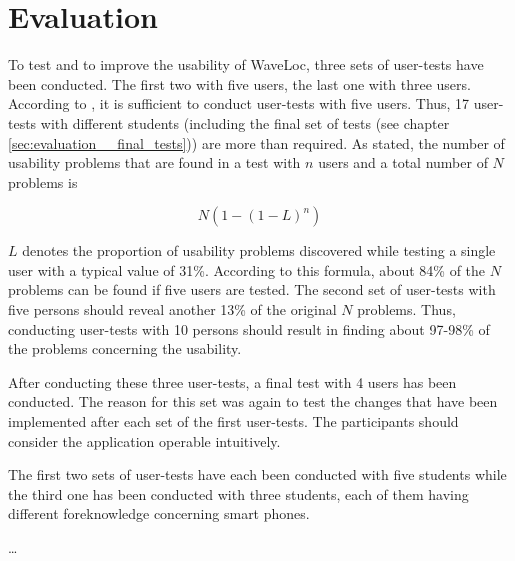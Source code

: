 \chapter{Evaluation}
\label{cha:evaluation}

To  test and to improve the usability of WaveLoc, three sets of user-tests have been conducted. The first two with five users, the last one with three users. According to \citet{ruleof5}, it is sufficient to conduct user-tests with five users. Thus, 17 user-tests with different students (including the final set of tests (see chapter \ref{sec:evaluation__final_tests})) are more than required. As stated, the number of usability problems that are found in a test with $n$ users and a total number of $N$ problems is

$$N(1-(1-L)^n)$$

$L$  denotes the proportion of usability problems discovered while testing a single user with a typical value of 31\%. According to this formula, about 84\% of the $N$ problems can be found if five users are tested. The second set of user-tests with five persons should reveal another 13\% of the original $N$ problems. Thus, conducting user-tests with 10 persons should result in finding about 97-98\% of the problems concerning the usability.

After conducting these three user-tests, a final test with 4 users has been conducted. The reason for this set was again to test the changes that have been implemented after each set of the first user-tests. The participants should consider the application operable intuitively.



The first two sets of user-tests have each been conducted with five students while the third one has been conducted with three students, each of them having different foreknowledge concerning smart phones.

\ldots{}